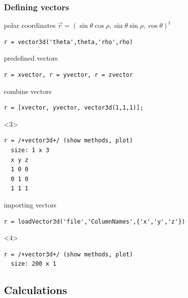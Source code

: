 \documentclass[compress]{beamer}
\begin{document}
\begin{frame}
  \frametitle{Defining vectors}

  \begin{overlayarea}{\textwidth}{8cm}

    polar coordinates $\vec r = (\sin \theta \cos \rho,\sin \theta \sin \rho,\cos \theta)^{t}$

\begin{lstlisting}[style=input]
r = vector3d('theta',theta,'rho',rho)
\end{lstlisting}

  \pause \medskip

  predefined vectors
\begin{lstlisting}[style=input]
r = xvector, r = yvector, r = zvector
\end{lstlisting}

  \pause \medskip

  combine vectors
\begin{lstlisting}[style=input]
r = [xvector, yvector, vector3d(1,1,1)];
\end{lstlisting}

\begin{onlyenv}<3>
  \vspace{-.3cm}
\begin{lstlisting}[style=output]
r = /+vector3d+/ (show methods, plot)
  size: 1 x 3
  x y z
  1 0 0
  0 1 0
  1 1 1
\end{lstlisting}
\end{onlyenv}

  \pause \medskip

  importing vectors
\begin{lstlisting}[style=input]
r = loadVector3d('file','ColumnNames',{'x','y','z'})
\end{lstlisting}
\begin{onlyenv}<4>
  \vspace{-.3cm}
\begin{lstlisting}[style=output]
r = /+vector3d+/ (show methods, plot)
  size: 200 x 1
\end{lstlisting}
\end{onlyenv}

\end{overlayarea}
\end{frame}

\subsection*{Calculations}
\end{document}
